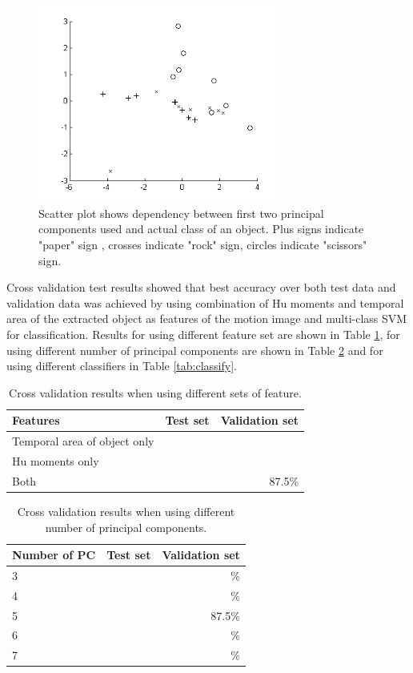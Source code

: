 
\begin{figure}
\begin{center}
\includegraphics[width=80mm]{paclassplot.png}
\caption{Scatter plot shows dependency between first two principal components used and actual class of an object. Plus signs indicate "paper" sign , crosses indicate "rock" sign, circles indicate "scissors" sign. }
\label{fig:paclassplot}
\end{center}
\end{figure}

Cross validation test results showed that best accuracy over both test data and validation data was achieved by using combination of Hu moments and temporal area of the extracted object as features of the motion image and multi-class SVM for classification. Results for using different feature set are shown in Table \ref{tab:features}, for using different number of principal components are shown in Table \ref{tab:pca} and for using different classifiers in Table \ref{tab:classify}.

\begin{table}
\begin{center}
\begin{tabular}{| l | r | r |}
\hline
Features & Test set & Validation set \\ \hline
Temporal area of object only & & \\
Hu moments only & & \\
Both & & 87.5\% \\
\hline
\end{tabular}
\end{center}
\caption{Cross validation results when using different sets of feature.}
\label{tab:features}
\end{table}


\begin{table}
\begin{center}
\begin{tabular}{| l | r | r |}
\hline
Number of PC & Test set & Validation set \\ \hline
3 & & \% \\
4 & & \% \\
5 & & 87.5\% \\
6 & & \% \\
7 & & \% \\
\hline
\end{tabular}
\end{center}
\caption{Cross validation results when using different number of principal components.}
\label{tab:pca}
\end{table}

